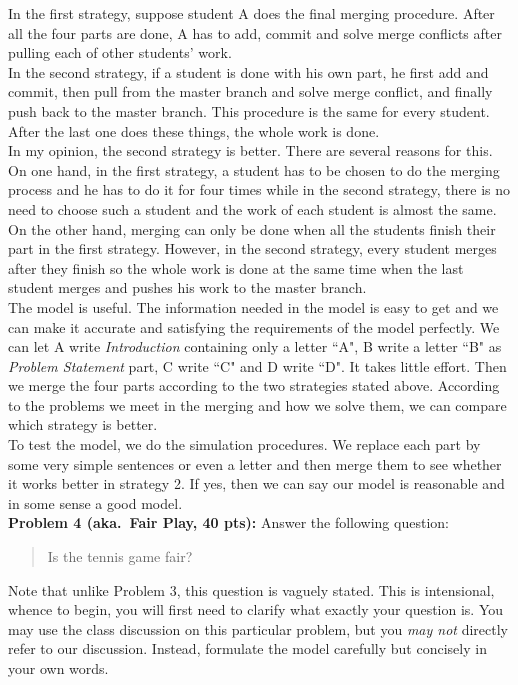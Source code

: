 \documentclass[12pt]{article}
\begin{document}
In the first strategy, suppose student A does the final merging procedure. After all the four parts are done, A has to add, commit and solve merge conflicts after pulling each of other students' work.\\

In the second strategy, if a student is done with his own part, he first add and commit, then pull from the master branch and solve merge conflict, and finally push back to the master branch. This procedure is the same for every student. After the last one does these things, the whole work is done.\\

In my opinion, the second strategy is better. There are several reasons for this. On one hand, in the first strategy, a student has to be chosen to do the merging process and he has to do it for four times while in the second strategy, there is no need to choose such a student and the work of each student is almost the same. On the other hand, merging can only be done when all the students finish their part in the first strategy. However, in the second strategy, every student merges after they finish so the whole work is done at the same time when the last student merges and pushes his work to the master branch.\\

The model is useful. The information needed in the model is easy to get and we can make it accurate and satisfying the requirements of the model perfectly. We can let A write \emph{Introduction} containing only a letter ``A", B write a letter ``B" as \emph{Problem Statement} part, C write ``C" and D write ``D". It takes little effort. Then we merge the four parts according to the two strategies stated above. According to the problems we meet in the merging and how we solve them, we can compare which strategy is better.\\

To test the model, we do the simulation procedures. We replace each part by some very simple sentences or even a letter and then merge them to see whether it works better in strategy 2. If yes, then we can say our model is reasonable and in some sense a good model.\\


\newpage
\vskip0.25in
\noindent\textbf{Problem 4 (aka.\ Fair Play, 40 pts):}
Answer the following question:
\begin{verse}
Is the tennis game fair?
\end{verse}
Note that unlike Problem 3, this question is vaguely stated.
This is intensional, whence to begin, you will first need to clarify
what exactly your question is.
You may use the class discussion on this particular 
problem, but you \emph{may not} directly refer to our 
discussion.  Instead, formulate the model carefully but concisely in 
your own words.   
\end{document}
